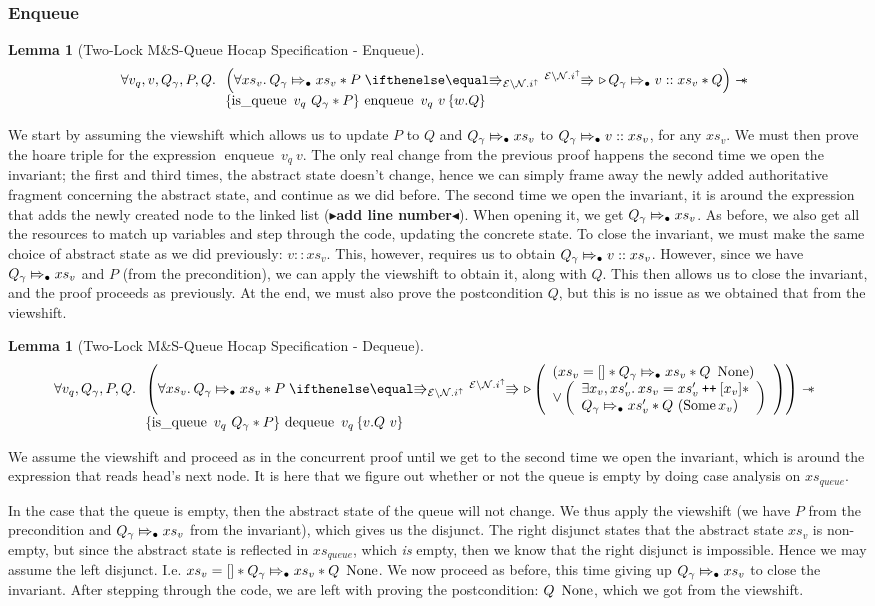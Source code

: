 \documentclass[a4paper, 11pt]{report}
\newtheorem{lemma}[theorem]{Lemma}
\newcommand{\enqueue}{\operatorname{enqueue}}
\newcommand{\dequeue}{\operatorname{dequeue}}
\newcommand{\isqueue}{\operatorname{is\_queue}}
\newcommand{\Qg}{Q_\gname}
\newcommand\catenate{\mathbin{\text{\ttfamily\upshape ++}}}
\newcommand{\Nl}{\ensuremath{\mathcal{N}}}
\newcommand{\abstractstateauth}[2]{#1 \Mapsto_{\bullet} #2}
\newcommand{\tlhocapspecenq}{\All v_q, v, Q_\gname, P, Q.
\begin{array}[t]{l}
\left(\All xs_v . \abstractstateauth{\Qg}{xs_v} \star P \vs[\mask\setminus\Nl.i^\uparrow] \later \abstractstateauth{\Qg}{v :: xs_v} \star Q \right)
\wand\\
\hoare{\isqueue \ v_q \ Q_\gname \star P}{\enqueue\ v_q\ v}{w . Q}
\end{array}}
\newcommand{\tlhocapspecdeq}{\All v_q, Q_\gname, P, Q.
\begin{array}[t]{l}
\left(\All xs_v . \abstractstateauth{\Qg}{xs_v} \star P \vs[\mask\setminus\Nl.i^\uparrow] \later
  \left(
    \begin{array}{l}
      (xs_v = [] \star \abstractstateauth{\Qg}{xs_v} \star Q \ \None)\\
      \lor
      \left(
        \begin{array}{l}
          \Exists x_v, xs_v' . xs_v = xs_v' \catenate [x_v] \star\\
          \abstractstateauth{\Qg}{xs_v'} \star Q \ (\Some{x_v})
        \end{array}
        \right)
    \end{array}
  \right) \right)
\wand\\
\hoare{\isqueue \ v_q \ Q_\gname \star P}{\dequeue\ v_q}{v . Q\ v}
\end{array}}
\newcommand{\todo}[1]{{\color[rgb]{.5,0,0}\textbf{$\blacktriangleright$#1$\blacktriangleleft$}}}
\begin{document}
\subsubsection{Enqueue}
\begin{lemma}[Two-Lock M\&S-Queue Hocap Specification - Enqueue]\label{TLMSQ:spec:hocap:enqueue}
  \begin{equation*}
    \tlhocapspecenq
  \end{equation*}
\end{lemma}
We start by assuming the viewshift which allows us to update $P$ to $Q$ and $\abstractstateauth{\Qg}{xs_v}$ to $\abstractstateauth{\Qg}{v :: xs_v}$, for any $xs_v$. We must then prove the hoare triple for the expression $\enqueue \ v_q \ v$. The only real change from the previous proof happens the second time we open the invariant; the first and third times, the abstract state doesn't change, hence we can simply frame away the newly added authoritative fragment concerning the abstract state, and continue as we did before. The second time we open the invariant, it is around the expression that adds the newly created node to the linked list (\todo{add line number}). When opening it, we get $\abstractstateauth{\Qg}{xs_v}$. As before, we also get all the resources to match up variables and step through the code, updating the concrete state. To close the invariant, we must make the same choice of abstract state as we did previously: $v :: xs_v$. This, however, requires us to obtain $\abstractstateauth{\Qg}{v :: xs_v}$. However, since we have $\abstractstateauth{\Qg}{xs_v}$ and $P$ (from the precondition), we can apply the viewshift to obtain it, along with $Q$. This then allows us to close the invariant, and the proof proceeds as previously. At the end, we must also prove the postcondition $Q$, but this is no issue as we obtained that from the viewshift.

\begin{lemma}[Two-Lock M\&S-Queue Hocap Specification - Dequeue]\label{TLMSQ:spec:hocap:dequeue}
  \begin{equation*}
    \tlhocapspecdeq
  \end{equation*}
\end{lemma}
We assume the viewshift and proceed as in the concurrent proof until we get to the second time we open the invariant, which is around the expression that reads head's next node. It is here that we figure out whether or not the queue is empty by doing case analysis on $xs_{queue}$.

In the case that the queue is empty, then the abstract state of the queue will not change. We thus apply the viewshift (we have $P$ from the precondition and $\abstractstateauth{\Qg}{xs_v}$ from the invariant), which gives us the disjunct. The right disjunct states that the abstract state $xs_v$ is non-empty, but since the abstract state is reflected in $xs_{queue}$, which \emph{is} empty, then we know that the right disjunct is impossible. Hence we may assume the left disjunct. I.e. $xs_v = [] \star \abstractstateauth{\Qg}{xs_v} \star Q \ \None$. We now proceed as before, this time giving up $\abstractstateauth{\Qg}{xs_v}$ to close the invariant. After stepping through the code, we are left with proving the postcondition: $Q \ \operatorname{None}$, which we got from the viewshift.
\end{document}
